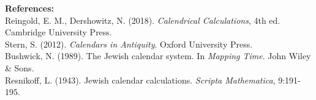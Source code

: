 \begin{technical}
\vspace{0.5em}
\textbf{References:}\\
Reingold, E. M., Dershowitz, N. (2018). \textit{Calendrical Calculations}, 4th ed. Cambridge University Press.\\
Stern, S. (2012). \textit{Calendars in Antiquity}. Oxford University Press.\\
Bushwick, N. (1989). The Jewish calendar system. In \textit{Mapping Time}. John Wiley \& Sons.\\
Resnikoff, L. (1943). Jewish calendar calculations. \textit{Scripta Mathematica}, 9:191-195.
\end{technical}
